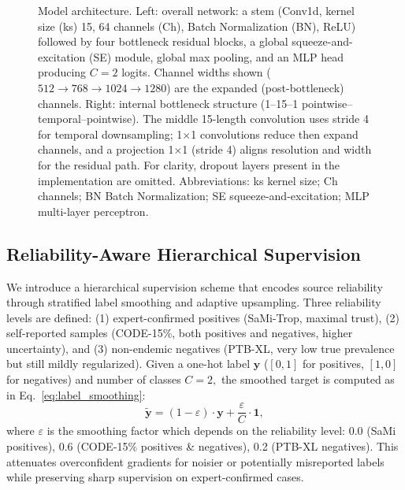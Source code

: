 \begin{figure*}[!t]
\centering

\caption{Model architecture. Left: overall network: a stem (Conv1d, kernel size (ks) 15, 64 channels (Ch), Batch Normalization (BN), ReLU) followed by four bottleneck residual blocks, a global squeeze-and-excitation (SE) module, global max pooling, and an MLP head producing $C = 2$ logits. Channel widths shown ($512 \to 768 \to 1024 \to 1280$) are the expanded (post-bottleneck) channels.
Right: internal bottleneck structure (1--15--1 pointwise--temporal--pointwise). The middle 15-length convolution uses stride 4 for temporal downsampling; 1$\times$1 convolutions reduce then expand channels, and a projection 1$\times$1 (stride 4) aligns resolution and width for the residual path. For clarity, dropout layers present in the implementation are omitted. Abbreviations: ks kernel size; Ch channels; BN Batch Normalization; SE squeeze-and-excitation; MLP multi-layer perceptron.}
\label{fig:model}
\end{figure*}


\subsection{Reliability-Aware Hierarchical Supervision}
\label{subsec:reliability}


We introduce a hierarchical supervision scheme that encodes source reliability through stratified label smoothing and adaptive upsampling. Three reliability levels are defined: (1) expert-confirmed positives (SaMi-Trop, maximal trust), (2) self-reported samples (CODE-15\%, both positives and negatives, higher uncertainty), and (3) non-endemic negatives (PTB-XL, very low true prevalence but still mildly regularized). Given a one-hot label $\mathbf{y}$ ($[0, 1]$ for positives, $[1, 0]$ for negatives) and number of classes $C = 2,$ the smoothed target is computed as in Eq.~\ref{eq:label_smoothing}:
\begin{equation}
\label{eq:label_smoothing}
\tilde{\mathbf{y}} = (1 - \varepsilon) \cdot \mathbf{y} + \frac{\varepsilon}{C} \cdot \mathbf{1},
\end{equation}
where $\varepsilon$ is the smoothing factor which depends on the reliability level: 0.0 (SaMi positives), 0.6 (CODE-15\% positives \& negatives), 0.2 (PTB-XL negatives). This attenuates overconfident gradients for noisier or potentially misreported labels while preserving sharp supervision on expert-confirmed cases.

